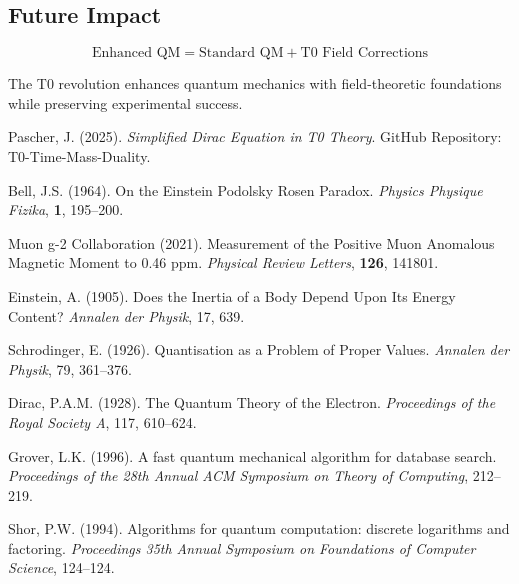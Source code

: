 \documentclass[12pt,a4paper]{article}
\begin{document}
	\subsection{Future Impact}
	
	\begin{equation}
		\boxed{\text{Enhanced QM} = \text{Standard QM} + \text{T0 Field Corrections}}
	\end{equation}
	
	The T0 revolution enhances quantum mechanics with field-theoretic foundations while preserving experimental success.
	
	\begin{thebibliography}{99}
		Pascher, J. (2025). \textit{Simplified Dirac Equation in T0 Theory}. GitHub Repository: T0-Time-Mass-Duality.
		
		Bell, J.S. (1964). On the Einstein Podolsky Rosen Paradox. \textit{Physics Physique Fizika}, \textbf{1}, 195--200.
		
		Muon g-2 Collaboration (2021). Measurement of the Positive Muon Anomalous Magnetic Moment to 0.46 ppm. \textit{Physical Review Letters}, \textbf{126}, 141801.
		
		Einstein, A. (1905). Does the Inertia of a Body Depend Upon Its Energy Content? \textit{Annalen der Physik}, 17, 639.
		
		Schrodinger, E. (1926). Quantisation as a Problem of Proper Values. \textit{Annalen der Physik}, 79, 361--376.
		
		Dirac, P.A.M. (1928). The Quantum Theory of the Electron. \textit{Proceedings of the Royal Society A}, 117, 610--624.
		
		Grover, L.K. (1996). A fast quantum mechanical algorithm for database search. \textit{Proceedings of the 28th Annual ACM Symposium on Theory of Computing}, 212--219.
		
		Shor, P.W. (1994). Algorithms for quantum computation: discrete logarithms and factoring. \textit{Proceedings 35th Annual Symposium on Foundations of Computer Science}, 124--124.
	\end{thebibliography}
	
\end{document}

